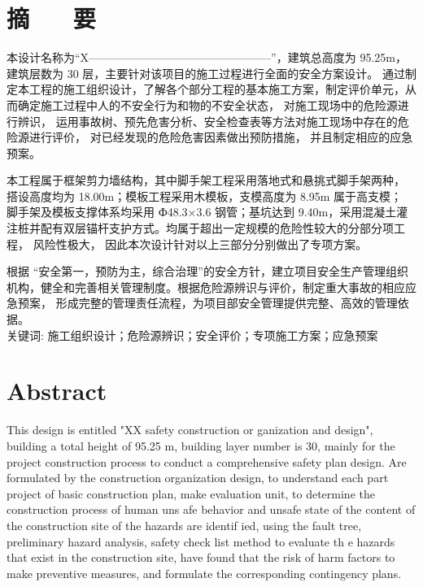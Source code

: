 \section*{ \centering 摘 ~~ 要}

\vskip0.5cm
本设计名称为“X————————————————”，建筑总高度为 95.25m， 建筑层数为 30  层，主要针对该项目的施工过程进行全面的安全方案设计。
通过制定本工程的施工组织设计，了解各个部分工程的基本施工方案，制定评价单元，从而确定施工过程中人的不安全行为和物的不安全状态，
对施工现场中的危险源进行辨识， 运用事故树、预先危害分析、安全检查表等方法对施工现场中存在的危险源进行评价， 对已经发现的危险危害因素做出预防措施，
并且制定相应的应急预案。

本工程属于框架剪力墙结构，其中脚手架工程采用落地式和悬挑式脚手架两种， 搭设高度均为 18.00m；模板工程采用木模板，支模高度为 8.95m 属于高支模；
脚手架及模板支撑体系均采用 Ф48.3×3.6 钢管；基坑达到 9.40m，采用混凝土灌注桩并配有双层锚杆支护方式。均属于超出一定规模的危险性较大的分部分项工程，
风险性极大， 因此本次设计针对以上三部分分别做出了专项方案。

根据 “安全第一，预防为主，综合治理”的安全方针，建立项目安全生产管理组织机构，健全和完善相关管理制度。根据危险源辨识与评价，制定重大事故的相应应急预案，
形成完整的管理责任流程，为项目部安全管理提供完整、高效的管理依据。\\



{ \heiti 关键词: } 施工组织设计；危险源辨识；安全评价；专项施工方案；应急预案
\pagestyle{fancy}

\clearpage
\section*{ \centering \textbf{Abstract} }

   This design is entitled "XX safety construction or ganization and design", building a total height of 95.25 m, building layer number is 30, 
   mainly for the project construction process to conduct a comprehensive safety plan design. Are formulated by the construction organization design, 
   to understand each part project of basic construction plan, make evaluation unit, to determine the construction process of human uns afe behavior 
   and unsafe state of the content of the construction site of the hazards are identif ied, using the fault tree, preliminary hazard analysis, safety 
   check list method to evaluate th e hazards that exist in the construction site, have found that the risk of harm factors to make preventive measures,
    and formulate the corresponding contingency plans.

